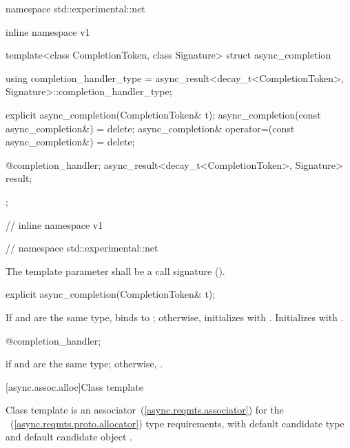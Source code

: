 \begin{codeblock}
namespace std::experimental::net {
inline namespace v1 {

  template<class CompletionToken, class Signature>
  struct async_completion
  {
    using completion_handler_type = async_result<decay_t<CompletionToken>,
      Signature>::completion_handler_type;

    explicit async_completion(CompletionToken& t);
    async_completion(const async_completion&) = delete;
    async_completion& operator=(const async_completion&) = delete;

    @\seebelow@ completion_handler;
    async_result<decay_t<CompletionToken>, Signature> result;
  };

} // inline namespace v1
} // namespace std::experimental::net
\end{codeblock}

\pnum
The template parameter  shall be a call signature ().

\begin{itemdecl}
explicit async_completion(CompletionToken& t);
\end{itemdecl}

\begin{itemdescr}
\pnum
\effects If  and  are the same type,
binds  to ;
otherwise, initializes  with .
Initializes  with .
\end{itemdescr}

\begin{itemdecl}
@\seebelow@ completion_handler;
\end{itemdecl}

\begin{itemdescr}
\pnum
\ctype {} if  and  are the same type; otherwise, .
\end{itemdescr}



[async.assoc.alloc]{Class template }

%
\pnum
Class template  is an associator~(\ref{async.reqmts.associator}) for the ~(\ref{async.reqmts.proto.allocator}) type requirements, with default candidate type  and default candidate object .

